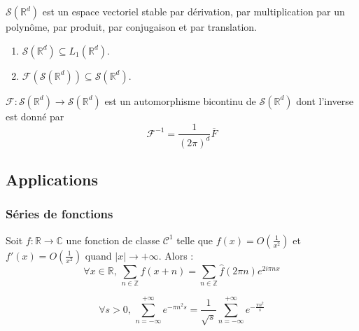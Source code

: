   \begin{proposition}
    $\mathcal{S}(\mathbb{R}^d)$ est un espace vectoriel stable par dérivation, par multiplication par un polynôme, par produit, par conjugaison et par translation.
  \end{proposition}

  \begin{theorem}
    \begin{enumerate}[label=(\roman*)]
      \item $\mathcal{S}(\mathbb{R}^d) \subseteq L_1(\mathbb{R}^d)$.
      \item $\mathcal{F}(\mathcal{S}(\mathbb{R}^d)) \subseteq \mathcal{S}(\mathbb{R}^d)$.
    \end{enumerate}
  \end{theorem}

  \begin{theorem}
    $\mathcal{F} : \mathcal{S}(\mathbb{R}^d) \rightarrow \mathcal{S}(\mathbb{R}^d)$ est un automorphisme bicontinu de $\mathcal{S}(\mathbb{R}^d)$ dont l'inverse est donné par
    \[ \mathcal{F}^{-1} = \frac{1}{(2 \pi)^d} \overline{F} \]
  \end{theorem}

  \subsection{Applications}

  \subsubsection{Séries de fonctions}


  \begin{theorem}
    Soit $f : \mathbb{R} \rightarrow \mathbb{C}$ une fonction de classe $\mathcal{C}^1$ telle que $f(x) = O \left( \frac{1}{x^2} \right)$ et $f'(x) = O \left( \frac{1}{x^2} \right)$ quand $|x| \longrightarrow +\infty$. Alors :
    \[ \forall x \in \mathbb{R}, \, \sum_{n \in \mathbb{Z}} f(x+n) = \sum_{n \in \mathbb{Z}} \widehat{f}(2 \pi n) e^{2 i \pi n x} \]
  \end{theorem}

  \begin{application}
    \[ \forall s > 0, \, \sum_{n=-\infty}^{+\infty} e^{-\pi n^2 s} = \frac{1}{\sqrt{s}} \sum_{n=-\infty}^{+\infty} e^{-\frac{\pi n^2}{s}} \]
  \end{application}

